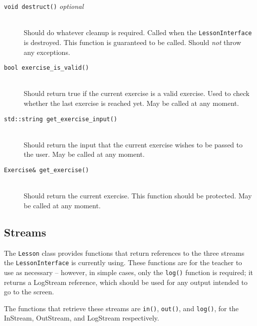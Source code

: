 \documentclass[12pt,a4paper]{report}
\begin{document}
\begin{description}
			\item[\texttt{void destruct()} \textit{optional}] \hfill \\
				Should do whatever cleanup is required.  Called when the
				\texttt{LessonInterface} is destroyed.  This function is
				guaranteed to be called.  Should \emph{not} throw any exceptions.

			\item[\texttt{bool exercise\_is\_valid()}] \hfill \\
				Should return true if the current exercise is a valid exercise.
				Used to check whether the last exercise is reached yet.  May be
				called at any moment.

			\item[\texttt{std::string get\_exercise\_input()}] \hfill \\
				Should return the input that the current exercise wishes to be
				passed to the user.  May be called at any moment.

			\item[\texttt{Exercise\& get\_exercise()}] \hfill \\
				Should return the current exercise.  This function should be
				protected.  May be called at any moment.
		\end{description}
		\subsection{Streams}
		The \texttt{Lesson} class provides functions that return references to
		the three streams the \texttt{LessonInterface} is currently using.  These
		functions are for the teacher to use as necessary -- however, in simple
		cases, only the \texttt{log()} function is required;  it returns a
		LogStream reference, which should be used for any output intended to go
		to the screen.

		The functions that retrieve these streams are \texttt{in()}, \texttt{out()},
		and \texttt{log()}, for the InStream, OutStream, and LogStream respectively.
\end{document}
